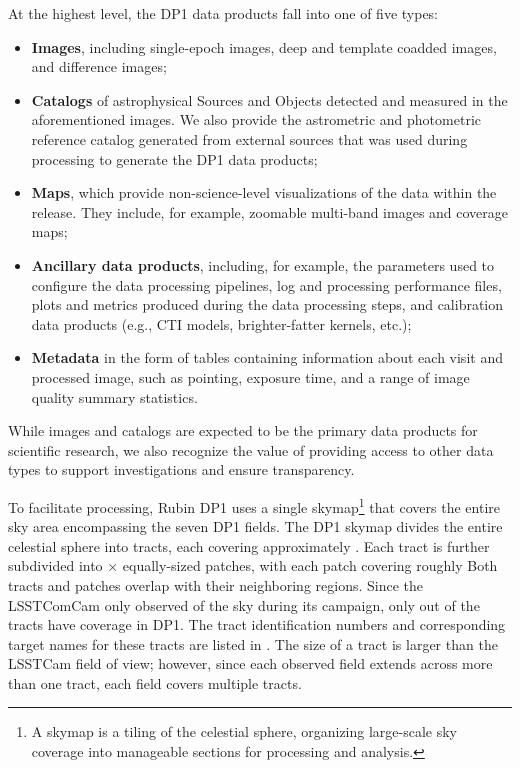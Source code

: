 At the highest level, the \gls{DP1} data products fall into one of five types:
\begin{itemize}
\item \textbf{Images}, including single-\gls{epoch} images, deep and template coadded images, and difference images;
\item \textbf{Catalogs} of astrophysical Sources and Objects detected and measured in the aforementioned images. We also provide the astrometric and photometric reference catalog generated from external sources that was used during processing to generate the \gls{DP1} data products;
\item \textbf{Maps}, which provide non-science-level visualizations of the data within the release. They include, for example, zoomable multi-band images and coverage maps;
\item \textbf{Ancillary data products}, including, for example, the parameters used to configure the data processing pipelines, log and processing performance files, plots and metrics produced during the data processing steps, and \gls{calibration} data products (e.g., \gls{CTI} models, brighter-fatter kernels, etc.);
\item \textbf{Metadata} in the form of tables containing information about each visit and processed image, such as pointing, exposure time, and a range of image quality summary statistics.
\end{itemize}
While images and catalogs are expected to be the primary data products for scientific research, we also recognize the value of providing access to other data types to support investigations and ensure transparency.

To facilitate processing, Rubin \gls{DP1} uses a single skymap\footnote{A skymap is a tiling of the celestial sphere, organizing large-scale sky coverage into manageable sections for processing and analysis.} that covers the entire sky area encompassing the seven \gls{DP1} fields.
The \gls{DP1} skymap divides the entire celestial sphere into \ntotaltracts tracts, each covering approximately \tractarea.
Each \gls{tract} is further subdivided into \npatchx × \npatchy equally-sized patches, with each \gls{patch} covering roughly \innerpatcharea
Both tracts and patches overlap with their neighboring regions.
Since the \gls{LSSTComCam} only observed \totalarea of the sky during its campaign, only \ncoveredtracts out of the \ntotaltracts tracts have coverage in \gls{DP1}.
The tract identification numbers and corresponding target names for these tracts are listed in .
The size of a tract is larger than the LSSTCam field of view; however, since each observed field extends across more than one tract, each field covers multiple tracts.


